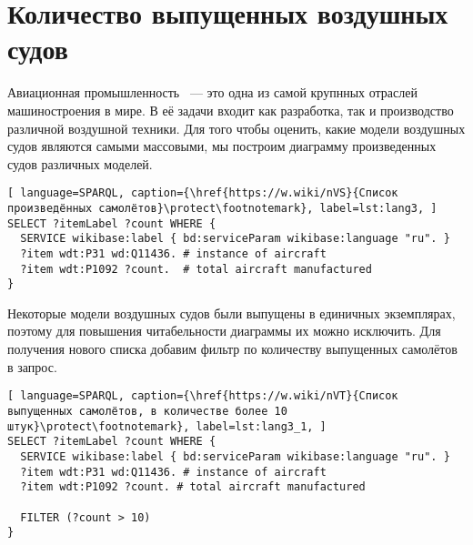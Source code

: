 \section{Количество выпущенных воздушных судов}

Авиационная промышленность ~--- это одна из самой крупнных отраслей машиностроения в мире. 
В её задачи входит как разработка, так и производство различной воздушной техники. 
Для того чтобы оценить, какие модели воздушных судов являются самыми массовыми, 
мы построим диаграмму произведенных судов различных моделей.

\begin{lstlisting}[ language=SPARQL, caption={\href{https://w.wiki/nVS}{Список произведённых самолётов}\protect\footnotemark}, label=lst:lang3, ]
SELECT ?itemLabel ?count WHERE {
  SERVICE wikibase:label { bd:serviceParam wikibase:language "ru". }
  ?item wdt:P31 wd:Q11436. # instance of aircraft
  ?item wdt:P1092 ?count.  # total aircraft manufactured
}
\end{lstlisting}


Некоторые модели воздушных судов были выпущены в единичных экземплярах, поэтому для повышения читабельности диаграммы их можно исключить. Для получения нового списка добавим фильтр по количеству выпущенных самолётов в запрос.

\begin{lstlisting}[ language=SPARQL, caption={\href{https://w.wiki/nVT}{Список выпущенных самолётов, в количестве более 10 штук}\protect\footnotemark}, label=lst:lang3_1, ]
SELECT ?itemLabel ?count WHERE {
  SERVICE wikibase:label { bd:serviceParam wikibase:language "ru". }
  ?item wdt:P31 wd:Q11436. # instance of aircraft
  ?item wdt:P1092 ?count. # total aircraft manufactured
  
  FILTER (?count > 10)
}
\end{lstlisting}



